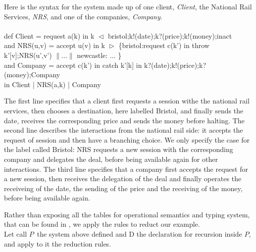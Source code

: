 \documentclass{article}
\newcommand{\PP}{\ensuremath{P}}
\begin{document}
Here is the syntax for the system made up of one client, {\em Client}, the National Rail Services, {\em NRS}, and one of the companies, {\em Company}.\\
~~\\
def Client = request a(k) in  k $\vartriangleleft$ bristol;k!(date);k?(price);k!(money);inact\\
and NRS(u,v) = accept u(v) in k $\vartriangleright$ \{bristol:request c(k') in throw k'[v];NRS(u',v') $\| ...\|$ newcastle: ... \} \\
and Company = accept c(k') in catch k'[k] in k?(date);k!(price);k?(money);Company\\
in Client | NRS(a,k) | Company

The first line specifies that a client first requests a session withe the national rail services, then chooses a destination, here labelled Bristol, and finally sends the date, receives the corresponding price and sends the money before halting. The second line describes  the interactions from the national rail side: it accepts the request of session and then have a branching choice. We only specify the case for the label called Bristol: NRS requests a new session with the corresponding company and delegates the deal, before being available again for other interactions. The third line specifies that a company first accepts the request for a new session, then receives the delegation of the deal and finally operates the receiveing of the date, the sending of the price and the receiving of the money, before being available again.

Rather than exposing all the tables for operational semantics and typing system, that can be found in \cite{honda1998language,yoshida2007language}, we apply the rules to reduct our example.\\
Let call \PP ~the system above defined and D the declaration for recursion inside \PP, and apply to it the reduction rules.
\end{document}
